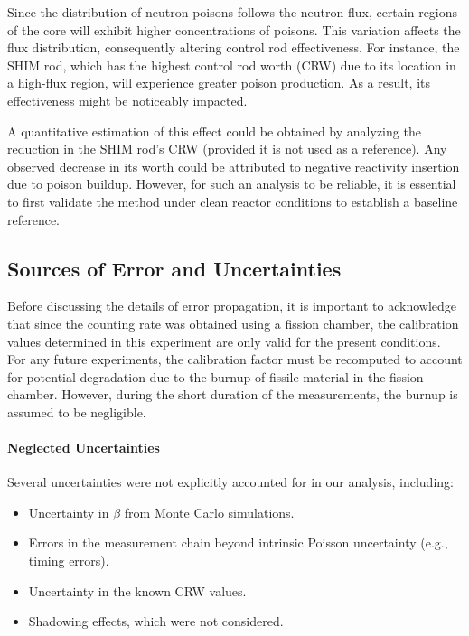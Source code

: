 Since the distribution of neutron poisons follows the neutron flux, certain regions of the core will exhibit higher concentrations of poisons. This variation affects the flux distribution, consequently altering control rod effectiveness. For instance, the SHIM rod, which has the highest control rod worth (CRW) due to its location in a high-flux region, will experience greater poison production. As a result, its effectiveness might be noticeably impacted.

A quantitative estimation of this effect could be obtained by analyzing the reduction in the SHIM rod's CRW (provided it is not used as a reference). Any observed decrease in its worth could be attributed to negative reactivity insertion due to poison buildup. However, for such an analysis to be reliable, it is essential to first validate the method under clean reactor conditions to establish a baseline reference.

\subsection{Sources of Error and Uncertainties}

Before discussing the details of error propagation, it is important to acknowledge that since the counting rate was obtained using a fission chamber, the calibration values determined in this experiment are only valid for the present conditions. For any future experiments, the calibration factor must be recomputed to account for potential degradation due to the burnup of fissile material in the fission chamber. However, during the short duration of the measurements, the burnup is assumed to be negligible.

\paragraph{Neglected Uncertainties} Several uncertainties were not explicitly accounted for in our analysis, including:

\begin{itemize}
    \item Uncertainty in $\beta$ from Monte Carlo simulations.
    \item Errors in the measurement chain beyond intrinsic Poisson uncertainty (e.g., timing errors).
    \item Uncertainty in the known CRW values.
    \item Shadowing effects, which were not considered.
\end{itemize}

